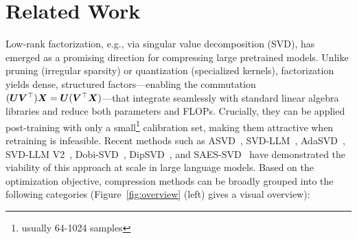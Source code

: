 \documentclass[10pt]{article} %
\theoremstyle{definition}
\theoremstyle{remark}
\begin{document}
\section{Related Work}
\label{sec:related}

Low-rank factorization, e.g., via singular value decomposition (SVD),  has emerged as a promising direction for compressing large pretrained models.
Unlike pruning (irregular sparsity) or quantization (specialized kernels), factorization yields dense, structured factors—enabling the commutation $({\bm{U}}{\bm{V}}^\top){\bm{X}} = {\bm{U}}({\bm{V}}^\top{\bm{X}})$—that integrate seamlessly with standard linear algebra libraries and reduce both parameters and FLOPs.
Crucially, they can be applied post-training with only a small\footnote{usually 64-1024 samples} calibration set, making them attractive when retraining is infeasible. Recent methods such as ASVD~\citep{yuan2023asvd}, SVD-LLM~\citep{wang2025svdllm}, AdaSVD~\citep{Li2025AdaSVD}, SVD-LLM V2~\citep{wang2025svdllmv2}, Dobi-SVD~\citep{Wang2025DobiSVD}, DipSVD~\citep{ding2025dipsvd}, and SAES-SVD~\citep{hu2026saes} have demonstrated the viability of this approach at scale in large language models.
Based on the optimization objective, compression methods can be broadly grouped into the following categories (Figure~\ref{fig:overview} (left) gives a visual overview):
\end{document}
